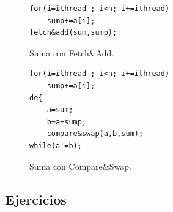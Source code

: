 \documentclass[12pt,spanish]{article}
\begin{document}
\begin{figure}[H]
\centering
\begin{verbatim}
for(i=ithread ; i<n; i+=ithread)
	sump+=a[i];
fetch&add(sum,sump);
\end{verbatim}
\caption{Suma con Fetch\&Add.}
\end{figure}

\begin{figure}[H]
\centering
\begin{verbatim}
for(i=ithread ; i<n; i+=ithread)
	sump+=a[i];
do{
	a=sum;
	b=a+sump;
	compare&swap(a,b,sum);
while(a!=b);
\end{verbatim}
\caption{Suma con Compare\&Swap.}
\end{figure}

\subsection{Ejercicios}
\end{document}
